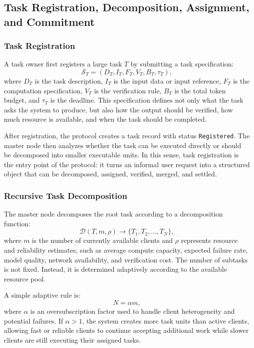 \documentclass{article}
\theoremstyle{plain}
\begin{document}
\subsection{Task Registration, Decomposition, Assignment, and Commitment}

\subsubsection{Task Registration}

A task owner first registers a large task $T$ by submitting a task specification:
\[
\mathcal{S}_T = (D_T, I_T, F_T, V_T, B_T, \tau_T),
\]
where $D_T$ is the task description, $I_T$ is the input data or input reference, $F_T$ is the computation specification, $V_T$ is the verification rule, $B_T$ is the total token budget, and $\tau_T$ is the deadline. This specification defines not only what the task asks the system to produce, but also how the output should be verified, how much resource is available, and when the task should be completed.

After registration, the protocol creates a task record with status \texttt{Registered}. The master node then analyzes whether the task can be executed directly or should be decomposed into smaller executable units. In this sense, task registration is the entry point of the protocol: it turns an informal user request into a structured object that can be decomposed, assigned, verified, merged, and settled.

\subsubsection{Recursive Task Decomposition}

The master node decomposes the root task according to a decomposition function:
\[
\mathcal{D}(T, m, \rho) \rightarrow \{T_1, T_2, \ldots, T_N\},
\]
where $m$ is the number of currently available clients and $\rho$ represents resource and reliability estimates, such as average compute capacity, expected failure rate, model quality, network availability, and verification cost. The number of subtasks is not fixed. Instead, it is determined adaptively according to the available resource pool.

A simple adaptive rule is:
\[
N = \alpha m,
\]
where $\alpha$ is an oversubscription factor used to handle client heterogeneity and potential failures. If $\alpha > 1$, the system creates more task units than active clients, allowing fast or reliable clients to continue accepting additional work while slower clients are still executing their assigned tasks.
\end{document}
